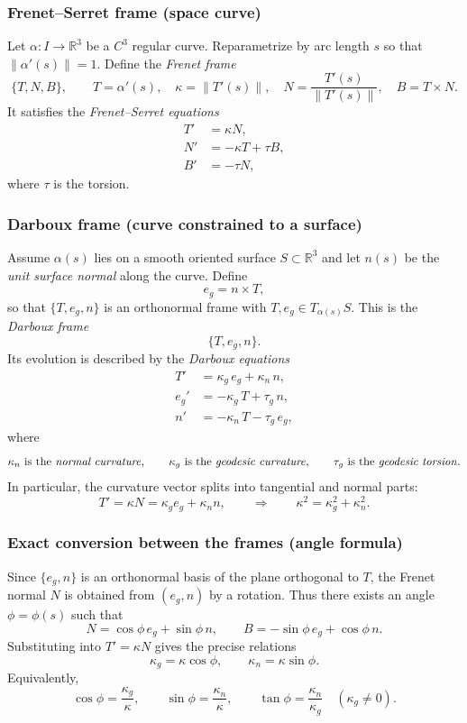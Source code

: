 \documentclass[12pt,a4paper]{article}
\theoremstyle{plain}
\theoremstyle{definition}      %
\begin{document}
	\subsubsection*{Frenet--Serret frame (space curve)}
	Let $\alpha:I\to\mathbb{R}^3$ be a $C^3$ regular curve. Reparametrize by arc length $s$
	so that $\|\alpha'(s)\|=1$. Define the \emph{Frenet frame}
	\[
	\boxed{\{T,N,B\}},
	\qquad
	T=\alpha'(s),\quad
	\kappa=\|T'(s)\|,
	\quad
	N=\frac{T'(s)}{\|T'(s)\|},
	\quad
	B=T\times N.
	\]
	It satisfies the \emph{Frenet--Serret equations}
	\[
	\boxed{
		\begin{aligned}
			T'&=\kappa N,\\
			N'&=-\kappa T+\tau B,\\
			B'&=-\tau N,
	\end{aligned}}
	\]
	where $\tau$ is the torsion.
	
	\subsubsection*{Darboux frame (curve constrained to a surface)}
	Assume $\alpha(s)$ lies on a smooth oriented surface $S\subset\mathbb{R}^3$ and let
	$n(s)$ be the \emph{unit surface normal} along the curve. Define
	\[
	e_g = n\times T,
	\]
	so that $\{T,e_g,n\}$ is an orthonormal frame with $T,e_g\in T_{\alpha(s)}S$.
	This is the \emph{Darboux frame}
	\[
	\boxed{\{T,e_g,n\}}.
	\]
	Its evolution is described by the \emph{Darboux equations}
	\[
	\boxed{
		\begin{aligned}
			T'&=\kappa_g\,e_g+\kappa_n\,n,\\
			e_g'&=-\kappa_g\,T+\tau_g\,n,\\
			n'&=-\kappa_n\,T-\tau_g\,e_g,
	\end{aligned}}
	\]
	where
	\[
	\kappa_n \ \text{is the \emph{normal curvature}},\qquad
	\kappa_g \ \text{is the \emph{geodesic curvature}},\qquad
	\tau_g \ \text{is the \emph{geodesic torsion}}.
	\]
	In particular, the curvature vector splits into tangential and normal parts:
	\[
	T'=\kappa N=\kappa_g e_g+\kappa_n n,
	\qquad\Rightarrow\qquad
	\boxed{\kappa^2=\kappa_g^2+\kappa_n^2.}
	\]
	
	\subsubsection*{Exact conversion between the frames (angle formula)}
	Since $\{e_g,n\}$ is an orthonormal basis of the plane orthogonal to $T$,
	the Frenet normal $N$ is obtained from $(e_g,n)$ by a rotation. Thus there exists
	an angle $\phi=\phi(s)$ such that
	\[
	\boxed{
		N=\cos\phi\,e_g+\sin\phi\,n,
		\qquad
		B=-\sin\phi\,e_g+\cos\phi\,n.}
	\]
	Substituting into $T'=\kappa N$ gives the precise relations
	\[
	\boxed{
		\kappa_g=\kappa\cos\phi,
		\qquad
		\kappa_n=\kappa\sin\phi.}
	\]
	Equivalently,
	\[
	\cos\phi=\frac{\kappa_g}{\kappa},
	\qquad
	\sin\phi=\frac{\kappa_n}{\kappa},
	\qquad
	\tan\phi=\frac{\kappa_n}{\kappa_g}\quad(\kappa_g\neq 0).
	\]
	
\end{document}

